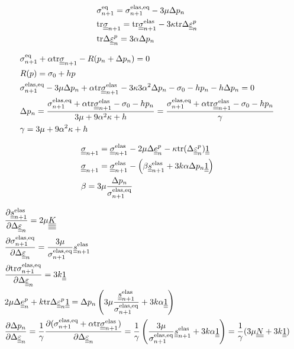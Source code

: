 \documentclass[12pt]{article}
\begin{document}
\begin{appendices}
    \begin{align}
        & \sigmaeqn = \sigmaeqnelas - 3\mu\Delta p_n \\
        & \mtr \uusigman = \mtr \uusigmanelas - 3\kappa \mtr \Deltaepsp \\
        & \mtr \Deltaepsp = 3\alpha \Delta p_n
    \end{align}

    \begin{align}
        & \sigmaeqn + \alpha \mtr \uusigman - R(p_n + \Delta p_n) = 0 \\
        & R(p) = \sigma_0 + h p \\
        & \sigmaeqnelas - 3\mu\Delta p_n + \alpha \mtr \uusigmanelas - 3\kappa 3\alpha^2 \Delta p_n - \sigma_0 - h p_n - h \Delta p_n = 0 \\
        & \Delta p_n = \frac{ \sigmaeqnelas + \alpha \mtr \uusigmanelas - \sigma_0 - h p_n}{ 3\mu + 9\alpha^2\kappa + h} = \frac{ \sigmaeqnelas + \alpha \mtr \uusigmanelas - \sigma_0 - h p_n}{ \gamma } \\
        & \gamma = 3\mu + 9\alpha^2\kappa + h
    \end{align}

    \begin{align}
        & \uusigma_{n+1} = \uusigma_{n+1}^\text{elas} - 2\mu \Deltaep - \kappa \mtr (\Deltaepsp) \uuUnit \\
        & \uusigma_{n+1} = \uusigma_{n+1}^\text{elas} - \left( \beta \uusnelas + 3k\alpha \Delta p_n \uuUnit \right) \\
        & \beta = 3\mu\frac{\Delta p_n}{\sigmaeqnelas} 
    \end{align}

    \begin{align}
        & \frac{\partial \uusnelas{}}{\partial \Deltaeps} = 2\mu \uuuuK\\
        & \frac{\partial \sigmaeqnelas{}}{\partial \Deltaeps} = \frac{3\mu}{\sigmaeqnelas}\uusnelas \\
        & \frac{\partial\mtr\sigmaeqnelas}{\partial\Deltaeps} = 3k\uuUnit \\
        & 2\mu\Deltaep + k\mtr\Deltaepsp\uuUnit = \Delta p_n\left( 3\mu \frac{\uusnelas}{\sigmaeqnelas} + 3k\alpha \uuUnit  \right) \\
        & \frac{\partial\Delta p_n}{\partial\Deltaeps} = \frac{1}{\gamma} \frac{\partial(\sigmaeqnelas + \alpha \mtr \uusigmanelas)}{\partial\Deltaeps} = \frac{1}{\gamma} \left( \frac{3\mu}{\sigmaeqnelas}\uusnelas + 3k\alpha\uuUnit \right) = \frac{1}{\gamma}(3\mu \uuN + 3k\uuUnit)
    \end{align}


\end{appendices}
\end{document}
